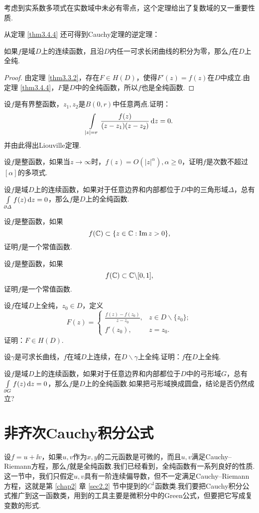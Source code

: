 考虑到实系数多项式在实数域中未必有零点，这个定理给出了复数域的又一重要性质.

从定理 \ref{thm3.4.4} 还可得到Cauchy定理的逆定理：
\begin{theorem}\label{thm3.5.4}
  如果$f$是域$D$上的连续函数，且沿$D$内任一可求长闭曲线的积分为零，那么$f$在$D$上全纯.
\end{theorem}
\begin{proof}
  由定理 \ref{thm3.3.2}，存在$F\in H(D)$，使得$F'(z)=f(z)$在$D$中成立.由定理 \ref{thm3.4.4}，$F$是$D$中的全纯函数，所以$f$也是全纯函数.
\end{proof}
\begin{xiti}
  \item 设$f$是有界整函数，$z_1,z_2$是$B(0,r)$中任意两点.证明：
    \[
      \int\limits_{|z|=r} \frac{f(z)}{(z-z_1)(z-z_2)}\mathop{}\!\mathrm dz = 0.
    \]
    并由此得出Liouville定理.
  \item 设$f$是整函数，如果当$z\to\infty$时，$f(z)=O(|z|^\alpha),\alpha\ge0$，证明$f$是次数不超过$[\alpha]$的多项式.
  \item 设$f$是域$D$上的连续函数，如果对于任意边界和内部都位于$D$中的三角形域$\varDelta$，总有$\int\limits_{\partial \varDelta}f(z)\mathop{}\!\mathrm dz=0$，那么$f$是$D$上的全纯函数.
  \item 设$f$是整函数，如果
    \[
      f(\mathbb C)\subset\{z\in\mathbb C:\operatorname{Im} z>0\},
    \]
    证明$f$是一个常值函数.
  \item 设$f$是整函数，如果
    \[
      f(\mathbb C)\subset \mathbb C\backslash[0,1],
    \]
    证明$f$是一个常值函数.
  \item 设$f$在域$D$上全纯，$z_0\in D$，定义
    \[
      F(z) = \begin{cases}
        \frac{f(z)-f(z_0)}{z-z_0}, & z\in D\backslash\{z_0\};\\
        f'(z_0), & z = z_0.
      \end{cases}
    \]
    证明：$F\in H(D)$.
  \item 设$\gamma$是可求长曲线，$f$在域$D$上连续，在$D\backslash\gamma$上全纯.证明：$f$在$D$上全纯.
  \item 设$f$是域$D$上的连续函数，如果对于任意边界和内部都位于$D$中的弓形域$G$，总有$\int\limits_{\partial G}f(z)\mathop{}\!\mathrm dz=0$，那么$f$是$D$上的全纯函数.如果把弓形域换成圆盘，结论是否仍然成立?
\end{xiti}

\section{非齐次Cauchy积分公式\label{sec3.6}}
设$f=u+\ii v$，如果$u,v$作为$x,y$的二元函数是可微的，而且$u,v$满足Cauchy--Riemann方程，那么$f$就是全纯函数.我们已经看到，全纯函数有一系列良好的性质.这一节中，我们只假定$u,v$具有一阶连续偏导数，但不一定满足Cauchy--Riemann方程，这就是第 \ref{chap2} 章 \ref{sec2.2} 节中提到的$C^1$函数类.我们要把Cauchy积分公式推广到这一函数类，用到的工具主要是微积分中的Green公式，但要把它写成复变数的形式.

